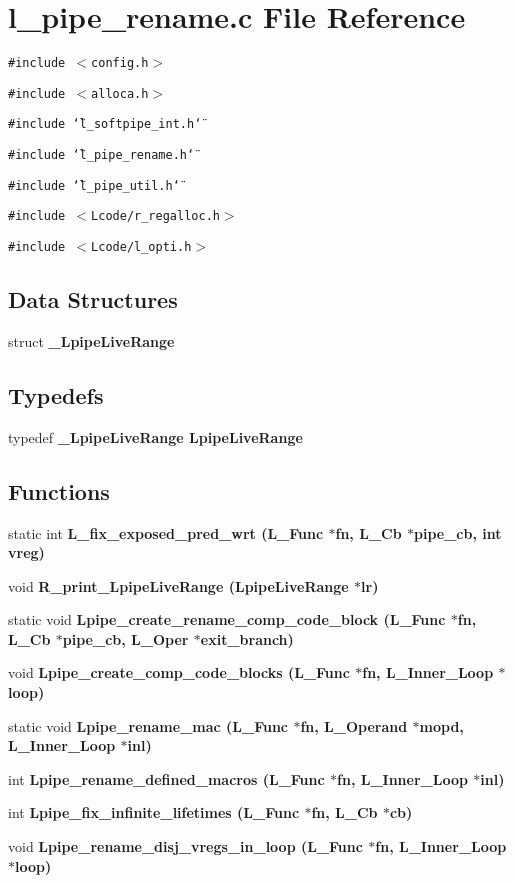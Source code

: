 \section{l\_\-pipe\_\-rename.c File Reference}
\label{l__pipe__rename_8c}
{\tt \#include $<$config.h$>$}\par
{\tt \#include $<$alloca.h$>$}\par
{\tt \#include \char`\"{}l\_\-softpipe\_\-int.h\char`\"{}}\par
{\tt \#include \char`\"{}l\_\-pipe\_\-rename.h\char`\"{}}\par
{\tt \#include \char`\"{}l\_\-pipe\_\-util.h\char`\"{}}\par
{\tt \#include $<$Lcode/r\_\-regalloc.h$>$}\par
{\tt \#include $<$Lcode/l\_\-opti.h$>$}\par
\subsection*{Data Structures}
\begin{CompactItemize}
\item 
struct \bf{\_\-Lpipe\-Live\-Range}
\end{CompactItemize}
\subsection*{Typedefs}
\begin{CompactItemize}
\item 
typedef \bf{\_\-Lpipe\-Live\-Range} \bf{Lpipe\-Live\-Range}
\end{CompactItemize}
\subsection*{Functions}
\begin{CompactItemize}
\item 
static int \bf{L\_\-fix\_\-exposed\_\-pred\_\-wrt} (L\_\-Func $\ast$fn, L\_\-Cb $\ast$pipe\_\-cb, int vreg)
\item 
void \bf{R\_\-print\_\-Lpipe\-Live\-Range} (\bf{Lpipe\-Live\-Range} $\ast$lr)
\item 
static void \bf{Lpipe\_\-create\_\-rename\_\-comp\_\-code\_\-block} (L\_\-Func $\ast$fn, L\_\-Cb $\ast$pipe\_\-cb, L\_\-Oper $\ast$exit\_\-branch)
\item 
void \bf{Lpipe\_\-create\_\-comp\_\-code\_\-blocks} (L\_\-Func $\ast$fn, L\_\-Inner\_\-Loop $\ast$loop)
\item 
static void \bf{Lpipe\_\-rename\_\-mac} (L\_\-Func $\ast$fn, L\_\-Operand $\ast$mopd, L\_\-Inner\_\-Loop $\ast$inl)
\item 
int \bf{Lpipe\_\-rename\_\-defined\_\-macros} (L\_\-Func $\ast$fn, L\_\-Inner\_\-Loop $\ast$inl)
\item 
int \bf{Lpipe\_\-fix\_\-infinite\_\-lifetimes} (L\_\-Func $\ast$fn, L\_\-Cb $\ast$cb)
\item 
void \bf{Lpipe\_\-rename\_\-disj\_\-vregs\_\-in\_\-loop} (L\_\-Func $\ast$fn, L\_\-Inner\_\-Loop $\ast$loop)
\end{CompactItemize}
